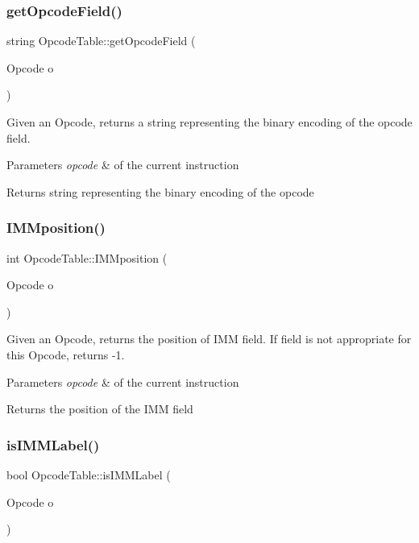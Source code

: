 \subsubsection{\texorpdfstring{get\+Opcode\+Field()}{getOpcodeField()}}
{\footnotesize\ttfamily string Opcode\+Table\+::get\+Opcode\+Field (\begin{DoxyParamCaption}\item[{Opcode}]{o }\end{DoxyParamCaption})}

Given an Opcode, returns a string representing the binary encoding of the opcode field. 
\begin{DoxyParams}{Parameters}
{\em opcode} & of the current instruction \\
\hline
\end{DoxyParams}
\begin{DoxyReturn}{Returns}
string representing the binary encoding of the opcode 
\end{DoxyReturn}
\mbox{\label{class_opcode_table_a588c7ea7780c6186ea685b632b231d33}} 
\subsubsection{\texorpdfstring{I\+M\+Mposition()}{IMMposition()}}
{\footnotesize\ttfamily int Opcode\+Table\+::\+I\+M\+Mposition (\begin{DoxyParamCaption}\item[{Opcode}]{o }\end{DoxyParamCaption})}

Given an Opcode, returns the position of I\+MM field. If field is not appropriate for this Opcode, returns -\/1. 
\begin{DoxyParams}{Parameters}
{\em opcode} & of the current instruction \\
\hline
\end{DoxyParams}
\begin{DoxyReturn}{Returns}
the position of the I\+MM field 
\end{DoxyReturn}
\mbox{\label{class_opcode_table_a5ef810fba22c54758dd69b09e8bfae8c}} 
\subsubsection{\texorpdfstring{is\+I\+M\+M\+Label()}{isIMMLabel()}}
{\footnotesize\ttfamily bool Opcode\+Table\+::is\+I\+M\+M\+Label (\begin{DoxyParamCaption}\item[{Opcode}]{o }\end{DoxyParamCaption})}

